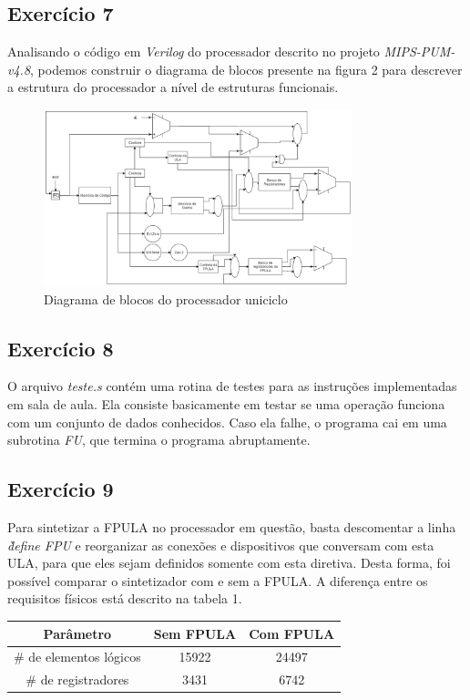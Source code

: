 \documentclass[12pt, a4paper, twoside]{article}
\begin{document}
\subsection{Exercício 7}

Analisando o código em \textit{Verilog} do processador descrito no projeto \textit{MIPS-PUM-v4.8}, podemos construir o diagrama de blocos presente na figura 2 para descrever a estrutura do processador a nível de estruturas funcionais.

\begin{figure}
    \centering
    \includegraphics[width=0.8\textwidth]{./figs/UNICICLO.png}
    \caption{Diagrama de blocos do processador uniciclo}
\end{figure}

\subsection{Exercício 8}

O arquivo \textit{teste.s} contém uma rotina de testes para as instruções implementadas em sala de aula. Ela consiste basicamente em testar se uma operação funciona com um conjunto de dados conhecidos. Caso ela falhe, o programa cai em uma subrotina \textit{FU}, que termina o programa abruptamente.

\subsection{Exercício 9}

Para sintetizar a FPULA no processador em questão, basta descomentar a linha \textit{\` define FPU} e reorganizar as conexões e dispositivos que conversam com esta ULA, para que eles sejam definidos somente com esta diretiva. Desta forma, foi possível comparar o sintetizador com e sem a FPULA. A diferença entre os requisitos físicos está descrito na tabela 1.

\begin{center}
  \begin{tabular}{ | c | c | c | }
    \hline
    Parâmetro                  & Sem FPULA & Com FPULA \\ \hline \hline
    \# de elementos lógicos    & 15922     & 24497     \\ \hline
    \# de registradores        & 3431      & 6742      \\ \hline
  \end{tabular}
\end{center}
\end{document}
